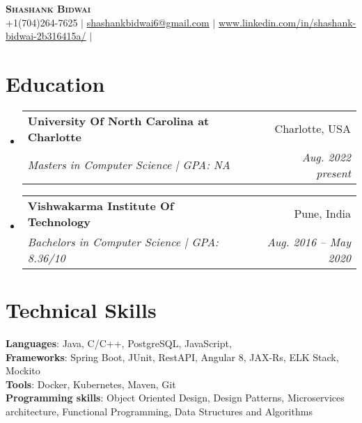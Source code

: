 \documentclass[letterpaper,11pt]{article}
\makeatletter
\newcommand{\resumeSubheading}[4]{
  \vspace{-2pt}\item
    \begin{tabular*}{0.97\textwidth}[t]{l@{\extracolsep{\fill}}r}
      \textbf{#1} & #2 \\
      \textit{\small#3} & \textit{\small #4} \\
    \end{tabular*}\vspace{-7pt}
}
\newcommand{\resumeSubHeadingListStart}{\begin{itemize}[leftmargin=0.15in, label={}]}
\newcommand{\resumeSubHeadingListEnd}{\end{itemize}}
\makeatother
\begin{document}

\begin{center}
    \textbf{\Huge \scshape Shashank Bidwai} \\ \vspace{1pt}
    \small +1(704)264-7625 $|$ \href{mailto:sbidwai@uncc.edu}{\underline{shashankbidwai6@gmail.com}} $|$ 
    \href{https://linkedin.com/in/...}{\underline{www.linkedin.com/in/shashank-bidwai-2b316415a/}} $|$
\end{center}


\section{Education}
  \resumeSubHeadingListStart
    \resumeSubheading
      {University Of North Carolina at Charlotte}{Charlotte, USA}
      {Masters in Computer Science | GPA: NA}{Aug. 2022 present}
    \resumeSubheading
      {Vishwakarma Institute Of Technology}{Pune, India}
      {Bachelors in Computer Science | GPA: 8.36/10}{Aug. 2016 -- May 2020}
  \resumeSubHeadingListEnd

\section{Technical Skills}
 \begin{itemize}[leftmargin=0.15in, label={}]
    \small{\item{
     \textbf{Languages}{: Java, C/C++, PostgreSQL, JavaScript,} \\
     \textbf{Frameworks}{: Spring Boot, JUnit, RestAPI, Angular 8, JAX-Rs, ELK Stack, Mockito} \\
     \textbf{Tools}{: Docker, Kubernetes, Maven, Git} \\
     \textbf{Programming skills}{: Object Oriented Design, Design Patterns, Microservices architecture, Functional Programming, Data Structures and Algorithms}
    }}
 \end{itemize}
\end{document}
